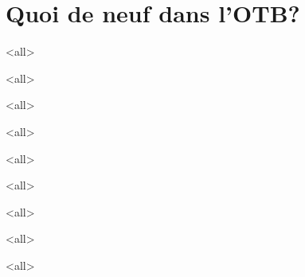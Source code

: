 \section{Quoi de neuf dans l'OTB?}

\mode<all>


\mode<all>


\mode<all>


\mode<all>


\mode<all>


\mode<all>


\mode<all>


\mode<all>


\mode<all>

